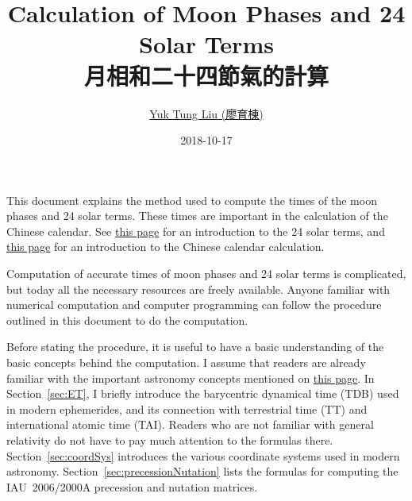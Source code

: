 \documentclass[12pt]{article}
\begin{document}
\begin{CJK}{UTF8}{bkai}

\title{Calculation of Moon Phases and 24 Solar Terms \\ 月相和二十四節氣的計算}
\author{\href{https://publish.illinois.edu/ytliu/}{Yuk Tung Liu (廖育棟)}}
\date{2018-10-17}
\maketitle

This document explains the method used to compute the times of 
the moon phases and 24 solar terms. These times are important in the 
calculation of the Chinese calendar. See \href{../solarTerms.html}{this page} 
for an introduction to the 24 solar terms, and \href{../rules.html}{this page} for 
an introduction to the Chinese calendar calculation.

Computation of accurate times of moon phases and 24 solar terms is complicated, but today 
all the necessary resources are freely available. Anyone familiar with
numerical computation and computer programming 
can follow the procedure outlined in this document 
to do the computation.

Before stating the procedure, it is useful to have a basic understanding of 
the basic concepts 
behind the computation. I assume that readers are already familiar with 
the important astronomy concepts mentioned on \href{../rules.html}{this page}. 
In Section~\ref{sec:ET}, I briefly introduce the barycentric dynamical time (TDB) 
used in modern ephemerides, and its connection with terrestrial time (TT) and 
international atomic time (TAI). Readers who are not familiar with general 
relativity do not have to pay much attention to the formulas there. 
Section~\ref{sec:coordSys} introduces the various coordinate systems used 
in modern astronomy. Section~\ref{sec:precessionNutation} lists the formulas 
for computing the IAU~2006/2000A precession and nutation matrices. 


\end{CJK}
\end{document}
